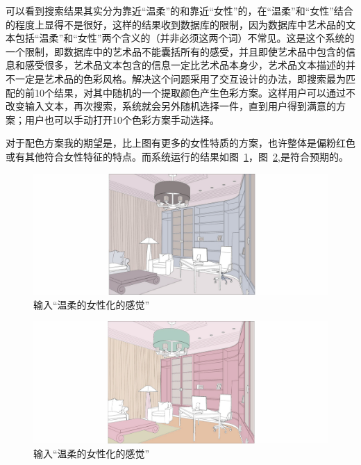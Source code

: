 \normalsize
可以看到搜索结果其实分为靠近“温柔”的和靠近“女性”的，在“温柔”和“女性”结合的程度上显得不是很好，这样的结果收到数据库的限制，因为数据库中艺术品的文本包括“温柔”和“女性”两个含义的（并非必须这两个词）不常见。这是这个系统的一个限制，即数据库中的艺术品不能囊括所有的感受，并且即使艺术品中包含的信息和感受很多，艺术品文本包含的信息一定比艺术品本身少，艺术品文本描述的并不一定是艺术品的色彩风格。解决这个问题采用了交互设计的办法，即搜索最为匹配的前10个结果，对其中随机的一个提取颜色产生色彩方案。这样用户可以通过不改变输入文本，再次搜索，系统就会另外随机选择一件，直到用户得到满意的方案；用户也可以手动打开10个色彩方案手动选择。

对于配色方案我的期望是，比上图有更多的女性特质的方案，也许整体是偏粉红色或有其他符合女性特征的特点。而系统运行的结果如图~\ref{figure:温柔女}，图~\ref{figure:温柔女2},是符合预期的。

\begin{figure}[!htbp]
\centering
\includegraphics[width=\linewidth,keepaspectratio]{data/chapter-4/温柔女性.jpg}
\caption{输入“温柔的女性化的感觉”}
\label{figure:温柔女}
\end{figure}

\begin{figure}[!htbp]
\centering
\includegraphics[width=\linewidth,keepaspectratio]{data/chapter-4/温柔女性2.jpg}
\caption{输入“温柔的女性化的感觉”}
\label{figure:温柔女2}
\end{figure}

